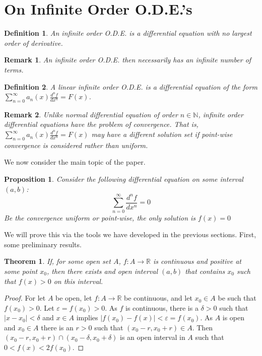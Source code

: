 \documentclass[crop=false,class=book]{standalone}
\theoremstyle{mystyle}
\newtheorem{theorem}{Theorem}[section]
\newtheorem{definition}{Definition}[section]
\newtheorem{proposition}{Proposition}[section]
\newtheorem{remark}{Remark}[section]
\begin{document}
\section{On Infinite Order O.D.E.'s}
\begin{definition}
An infinite order O.D.E. is a differential equation with no largest order of derivative.
\end{definition}
\begin{remark}
An infinite order O.D.E. then necessarily has an infinite number of terms.
\end{remark}
\begin{definition}
A linear infinite order O.D.E. is a differential equation of the form $\sum_{n=0}^{\infty} a_n(x) \frac{d^n f}{dx^n} = F(x)$.
\end{definition}
\begin{remark}
Unlike normal differential equation of order $n\in \mathbb{N}$, infinite order differential equations have the problem of convergence. That is, $\sum_{n=0}^{\infty} a_n(x) \frac{d^n f}{dx^n} = F(x)$ may have a different solution set if point-wise convergence is considered rather than uniform.
\end{remark}
We now consider the main topic of the paper.
\begin{proposition}
Consider the following differential equation on some interval $(a,b)$:
\begin{equation}
\nonumber \sum_{n=0}^{\infty} \frac{d^n f}{dx^n} = 0
\end{equation}
Be the convergence uniform or point-wise, the only solution is $f(x)=0$
\end{proposition}
We will prove this via the tools we have developed in the previous sections. First, some preliminary results.
\begin{theorem}
If, for some open set $A$, $f:A\rightarrow \mathbb{R}$ is continuous and positive at some point $x_0$, then there exists and open interval $(a,b)$ that contains $x_0$ such that $f(x)>0$ on this interval.
\end{theorem}
\begin{proof}
For let $A$ be open, let $f:A\rightarrow \mathbb{R}$ be continuous, and let $x_0\in A$ be such that $f(x_0)>0$. Let $\varepsilon = f(x_0)>0$. As $f$ is continuous, there is a $\delta>0$ such that $|x-x_0|<\delta$ and $x\in A$ implies $|f(x_0)-f(x)|<\varepsilon = f(x_0)$. As $A$ is open and $x_0\in A$ there is an $r>0$ such that $(x_0-r,x_0+r)\in A$. Then $(x_0-r,x_0+r)\cap (x_0-\delta,x_0+\delta)$ is an open interval in $A$ such that $0<f(x)<2f(x_0)$.
\end{proof}
\end{document}
